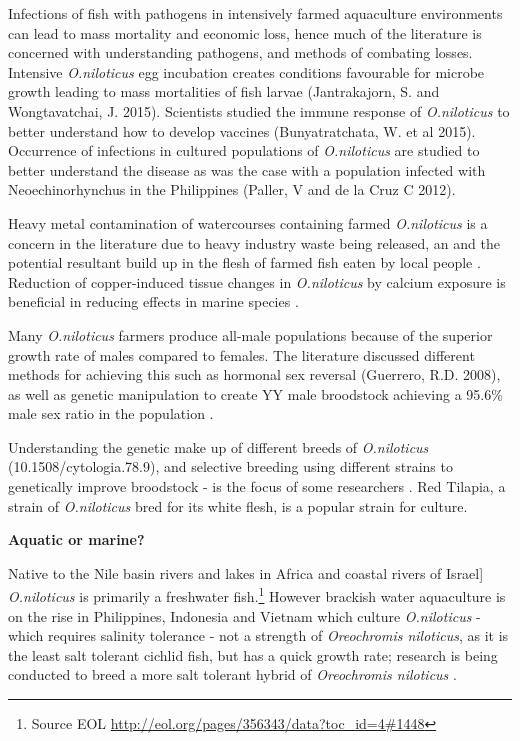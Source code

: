 \documentclass[]{book}
\theoremstyle{definition}
\theoremstyle{definition}
\theoremstyle{definition}
\theoremstyle{remark}
\begin{document}
Infections of fish with pathogens in intensively farmed aquaculture
environments can lead to mass mortality and economic loss, hence much of
the literature is concerned with understanding pathogens, and methods of
combating losses. Intensive \emph{O.niloticus} egg incubation creates
conditions favourable for microbe growth leading to mass mortalities of
fish larvae (Jantrakajorn, S. and Wongtavatchai, J. 2015). Scientists
studied the immune response of \emph{O.niloticus} to better understand
how to develop vaccines (Bunyatratchata, W. et al 2015). Occurrence of
infections in cultured populations of \emph{O.niloticus} are studied to
better understand the disease as was the case with a population infected
with Neoechinorhynchus in the Philippines (Paller, V and de la Cruz C
2012).

Heavy metal contamination of watercourses containing farmed
\emph{O.niloticus} is a concern in the literature due to heavy industry
waste being released, an and the potential resultant build up in the
flesh of farmed fish eaten by local people
\citep{Baharom_2015, Marcussen_2007}. Reduction of copper-induced tissue
changes in \emph{O.niloticus} by calcium exposure is beneficial in
reducing effects in marine species \citep{Kosai_2009}.

Many \emph{O.niloticus} farmers produce all-male populations because of
the superior growth rate of males compared to females. The literature
discussed different methods for achieving this such as hormonal sex
reversal (Guerrero, R.D. 2008), as well as genetic manipulation to
create YY male broodstock achieving a 95.6\% male sex ratio in the
population \citep{Mair_1997}.

Understanding the genetic make up of different breeds of
\emph{O.niloticus} (10.1508/cytologia.78.9), and selective breeding
using different strains to genetically improve broodstock - is the focus
of some researchers \citep{Bentsen_1998}. Red Tilapia, a strain of
\emph{O.niloticus} bred for its white flesh, is a popular strain for
culture.

\textbf{Aquatic or marine?}

Native to the Nile basin rivers and lakes in Africa and coastal rivers
of Israel{]} \emph{O.niloticus} is primarily a freshwater
fish.\footnote{Source EOL
  \url{http://eol.org/pages/356343/data?toc_id=4\#1448}} However
brackish water aquaculture is on the rise in Philippines, Indonesia and
Vietnam which culture \emph{O.niloticus} - which requires salinity
tolerance - not a strength of \emph{Oreochromis niloticus}, as it is the
least salt tolerant cichlid fish, but has a quick growth rate; research
is being conducted to breed a more salt tolerant hybrid of
\emph{Oreochromis niloticus} \citep{Kamal_2005}.
\end{document}
